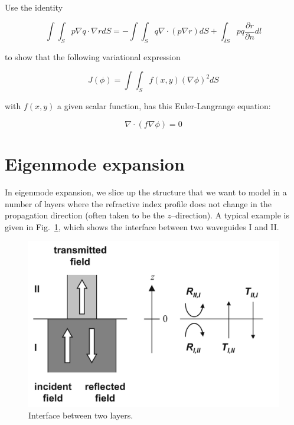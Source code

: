 \begin{sidebar}
\begin{ex}

Use the identity

$$\int \int_S p \nabla q \cdot \nabla r dS= - \int \int_S q \nabla \cdot (p \nabla r) dS + \int_{\delta S} pq \frac{\partial r}{\partial n} dl$$

to show that the following variational expression

$$J(\phi)=\int \int_S f(x,y) (\nabla \phi)^2 dS$$

with $f(x,y)$ a given scalar function, has this Euler-Langrange equation:

$$\nabla \cdot \left( f \nabla \phi \right) = 0 $$

\end{ex}
\end{sidebar}

\section{Eigenmode expansion}

In eigenmode expansion, we slice up the structure that we want to model in a number of layers where the refractive index profile does not change in the propagation direction (often taken to be the $z$--direction). A typical example is given in Fig.~\ref{fig-interface}, which shows the interface between two waveguides I and II.

\begin{figure}
\centering
\includegraphics{numeric/figures/interface}
\caption{Interface between two layers.}
\label{fig-interface}
\end{figure}

